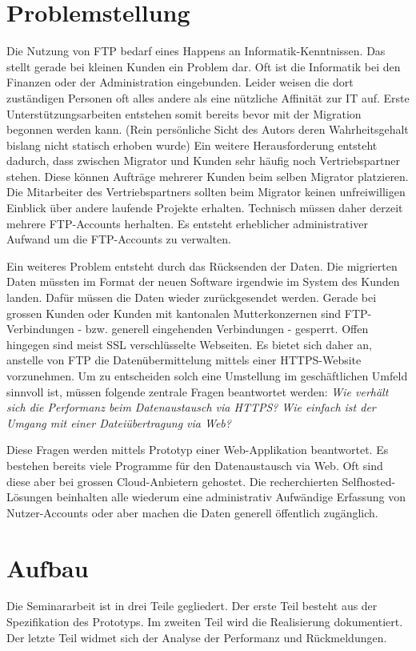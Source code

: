 \section{Problemstellung}
Die Nutzung von FTP bedarf eines Happens an Informatik-Kenntnissen. Das stellt gerade bei kleinen Kunden ein Problem dar.
Oft ist die Informatik bei den Finanzen oder der Administration eingebunden. 
Leider weisen die dort zuständigen Personen oft alles andere als eine nützliche Affinität zur IT auf. 
Erste Unterstützungsarbeiten entstehen somit bereits bevor mit der Migration begonnen werden kann. 
(Rein persönliche Sicht des Autors deren Wahrheitsgehalt bislang nicht statisch erhoben wurde)
Ein weitere Herausforderung entsteht dadurch, dass zwischen Migrator und Kunden sehr häufig noch Vertriebspartner stehen. 
Diese können Aufträge mehrerer Kunden beim selben Migrator platzieren. 
Die Mitarbeiter des Vertriebspartners sollten beim Migrator keinen unfreiwilligen Einblick über andere laufende Projekte erhalten. 
Technisch müssen daher derzeit mehrere FTP-Accounts herhalten. Es entsteht erheblicher administrativer Aufwand um die FTP-Accounts zu verwalten.

Ein weiteres Problem entsteht durch das Rücksenden der Daten. 
Die migrierten Daten müssten im Format der neuen Software irgendwie im System des Kunden landen.
Dafür müssen die Daten wieder zurückgesendet werden. Gerade bei grossen Kunden oder Kunden mit kantonalen Mutterkonzernen sind FTP-Verbindungen - bzw. generell eingehenden Verbindungen - gesperrt. 
Offen hingegen sind meist SSL verschlüsselte Webseiten. 
Es bietet sich daher an, anstelle von FTP die Datenübermittelung mittels einer HTTPS-Website vorzunehmen. 
Um zu entscheiden solch eine Umstellung im geschäftlichen Umfeld sinnvoll ist, müssen folgende zentrale Fragen beantwortet werden:
\textit{Wie verhält sich die Performanz beim Datenaustausch via HTTPS?} 
\textit{Wie einfach ist der Umgang mit einer Dateiübertragung via Web?}

Diese Fragen werden mittels Prototyp einer Web-Applikation beantwortet. 
Es bestehen bereits viele Programme für den Datenaustausch via Web. Oft sind diese aber bei grossen Cloud-Anbietern gehostet. 
Die recherchierten Selfhosted-Lösungen beinhalten alle wiederum eine administrativ Aufwändige Erfassung von Nutzer-Accounts oder aber machen die Daten generell öffentlich zugänglich.

\section{Aufbau}
Die Seminararbeit ist in drei Teile gegliedert. 
Der erste Teil besteht aus der Spezifikation des Prototyps. 
Im zweiten Teil wird die Realisierung dokumentiert. Der letzte Teil widmet sich der Analyse der Performanz und Rückmeldungen.


